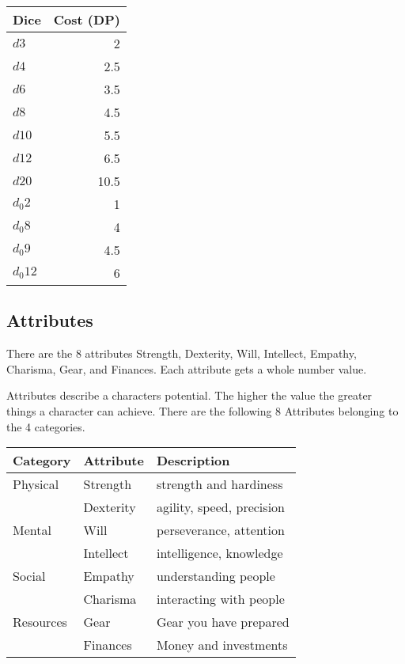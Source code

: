 \documentclass[11pt]{article}
\begin{document}
{\begin{center}
\begin{tabular}{lr}
Dice & Cost (DP)\\
\hline
\(d3\) & 2\\
\(d4\) & 2.5\\
\(d6\) & 3.5\\
\(d8\) & 4.5\\
\(d10\) & 5.5\\
\(d12\) & 6.5\\
\(d20\) & 10.5\\
\(d_0 2\) & 1\\
\(d_0 8\) & 4\\
\(d_0 9\) & 4.5\\
\(d_0 12\) & 6\\
\end{tabular}
\end{center}
\subsection{Attributes}
\label{sec:org3a61d39}
\begin{short}
There are the 8 attributes Strength, Dexterity, Will, Intellect, Empathy, Charisma, Gear, and Finances. Each attribute gets a whole number value.
\end{short}

Attributes describe a characters potential. The higher the value the greater things a character can achieve. There are the following 8 Attributes belonging to the 4 categories.

\begin{center}
\begin{tabular}{lll}
\textbf{Category} & \textbf{Attribute} & \textbf{Description}\\
\hline
Physical & Strength & strength and hardiness\\
 & Dexterity & agility, speed, precision\\
\hline
Mental & Will & perseverance, attention\\
 & Intellect & intelligence, knowledge\\
\hline
Social & Empathy & understanding people\\
 & Charisma & interacting with people\\
\hline
Resources & Gear & Gear you have prepared\\
 & Finances & Money and investments\\
\end{tabular}
\end{center}

}
\end{document}
